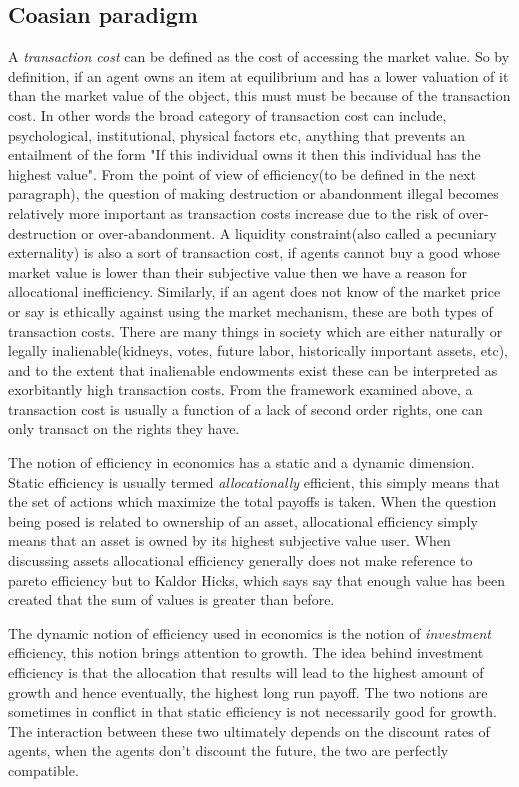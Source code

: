 \documentclass[12pt]{article}
\numberwithin{equation}{section}
\begin{document}
\subsection{Coasian paradigm}

A \textit{transaction cost} can be defined as the cost of accessing the market value. So by definition, if an agent owns an item at equilibrium and has a lower valuation of it than the market value of the object, this must must be because of the transaction cost. In other words the broad category of transaction cost can include, psychological, institutional, physical factors etc, anything that prevents an entailment of the form "If this individual owns it then this individual has the highest value". From the point of view of efficiency(to be defined in the next paragraph), the question of making destruction or abandonment illegal becomes relatively more important as transaction costs increase due to the risk of over-destruction or over-abandonment. A liquidity constraint(also called a pecuniary externality) is also a sort of transaction cost, if agents cannot buy a good whose market value is lower than their subjective value then we have a reason for allocational inefficiency. Similarly, if an agent does not know of the market price or say is ethically against using the market mechanism, these are both types of transaction costs. There are many things in society which are either naturally or legally inalienable(kidneys, votes, future labor, historically important assets, etc), and to the extent that inalienable endowments exist these can be interpreted as exorbitantly high transaction costs. From the framework examined above, a transaction cost is usually a function of a lack of second order rights, one can only transact on the rights they have. 

The notion of efficiency in economics has a static and a dynamic dimension. Static efficiency is usually termed \textit{allocationally} efficient, this simply means that the set of actions which maximize the total payoffs is taken. When the question being posed is related to ownership of an asset, allocational efficiency simply means that an asset is owned by its highest subjective value user. When discussing assets allocational efficiency generally does not make reference to pareto efficiency but to Kaldor Hicks, which says say that enough value has been created that the sum of values is greater than before. 

The dynamic notion of efficiency used in economics is the notion of \textit{investment} efficiency, this notion brings attention to growth. The idea behind investment efficiency is that the allocation that results will lead to the highest amount of growth and hence eventually, the highest long run payoff. The two notions are sometimes in conflict in that static efficiency is not necessarily good for growth. The interaction between these two ultimately depends on the discount rates of agents, when the agents don't discount the future, the two are perfectly compatible. 
\end{document}
